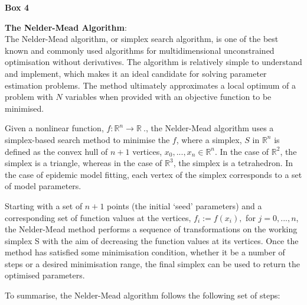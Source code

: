 \documentclass[11pt, a4paper, oneside,titlepage]{article}
\begin{document}
\newpage
\begin{framed}
{\begin{center}{\bf Box 4}\end{center}}
{\bf The Nelder-Mead Algorithm}:\\
The Nelder-Mead algorithm, or simplex search algorithm, is one of the
best known and commonly used algorithms for multidimensional
unconstrained optimisation without derivatives. The algorithm is
relatively simple to understand and implement, which makes it an ideal
candidate for solving parameter estimation problems. The method
ultimately approximates a local optimum of a problem with $N$
variables when provided with an objective function to be minimised.

Given a nonlinear function, $f : {\mathbb
  R}^n \to {\mathbb R}\ .$, the Nelder-Mead algorithm uses a
simplex-based search method to minimise the $f$, where a simplex, $S$
in ${\mathbb R}^n$ is defined as the convex hull of $n + 1$ vertices,
$x_0,...,x_n \in {\mathbb R}^n$. In the case of ${\mathbb R}^2$, the
simplex is a triangle, whereas in the case of ${\mathbb R}^3$, the
simplex is a tetrahedron. In the case of epidemic model fitting, each
vertex of the simplex corresponds to a set of model parameters.

Starting with a set of $n+1$ points (the initial `seed' parameters)
and a corresponding set of function values at the vertices, $f_i :=
f(x_i),$ for $j = 0,...,n$, the Nelder-Mead method performs a sequence
of transformations on the working simplex S with the aim of decreasing
the function values at its vertices. Once the method has satisfied
some minimisation condition, whether it be a number of steps or a
desired minimisation range, the final simplex can be used to return
the optimised parameters.

To summarise, the Nelder-Mead algorithm follows the following set of
steps:


\end{framed}
\end{document}
